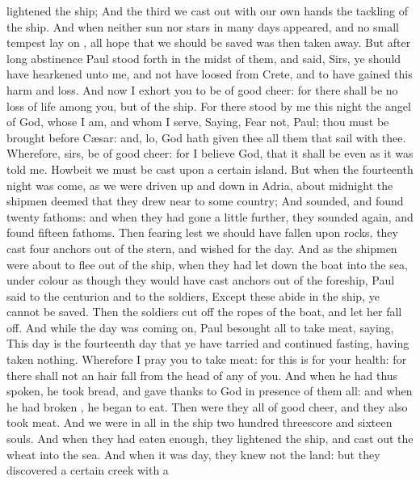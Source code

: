 {lightened the
ship;
And the
third
{} we cast
out with our own
hands the
tackling of the
ship.
And when
neither
sun
nor
stars
in
many
days
appeared,
and
no
small
tempest lay
on
{},
all
hope that
we should be
saved
was
then taken
away.
But
after
long
abstinence
Paul stood
forth
in the
midst of
them, and
said,
Sirs, ye
should have
hearkened unto
me,
and
not have
loosed
from
Crete,
and to have
gained
this
harm
and
loss.
And
now I
exhort
you to be of good
cheer:
for there shall
be
no loss
of
{}
life
among
you,
but of the
ship.
For there
stood by
me
this
night the
angel of
God,
whose I
am,
and
whom I
serve,
Saying,
Fear
not,
Paul;
thou must
be brought
before
Cæsar:
and,
lo,
God hath
given
thee
all
them that
sail
with
thee.
Wherefore,
sirs, be of good
cheer:
for I
believe
God,
that
it shall
be
even
as it was
told
me.
Howbeit
we
must be
cast
upon a
certain
island.
But
when the
fourteenth
night was
come, as
we were driven up and
down
in
Adria,
about
midnight the
shipmen deemed
that
they drew near
to
some
country;
And
sounded, and
found
{}
twenty
fathoms:
and when they had
gone a little
further, they
sounded
again,
and
found
{}
fifteen
fathoms.
Then
fearing
lest we should have
fallen
upon
rocks, they
cast
four
anchors out
of the
stern, and
wished
for the
day.
And as the
shipmen were
about to
flee out
of the
ship,
when they had let
down the
boat
into the
sea, under
colour as
though they
would have
cast
anchors out
of the
foreship,
Paul
said to the
centurion
and to the
soldiers,
Except
these
abide
in the
ship,
ye
cannot be
saved.
Then the
soldiers cut
off the
ropes of the
boat,
and
let
her fall
off.
And
while the
day
was coming
on,
Paul
besought
{}
all to
take
meat,
saying, This
day is the
fourteenth
day
that ye have
tarried and
continued
fasting, having
taken
nothing.
Wherefore I
pray
you to
take
{}
meat:
for this
is
for
your
health:
for there
shall
not an
hair
fall
from the
head of any of
you.
And
when he
had
thus
spoken, he
took
bread,
and gave
thanks to
God in
presence of them
all:
and when he had
broken
{}, he
began to
eat.
Then
were they
all of good
cheer,
and
they also
took
{}
meat.
And we
were in
all
in the
ship two
hundred threescore
and
sixteen
souls.
And
when they had
eaten
enough, they
lightened the
ship, and cast
out the
wheat
into the
sea.
And
when it
was
day, they
knew
not the
land:
but they
discovered a
certain
creek
with a
}
